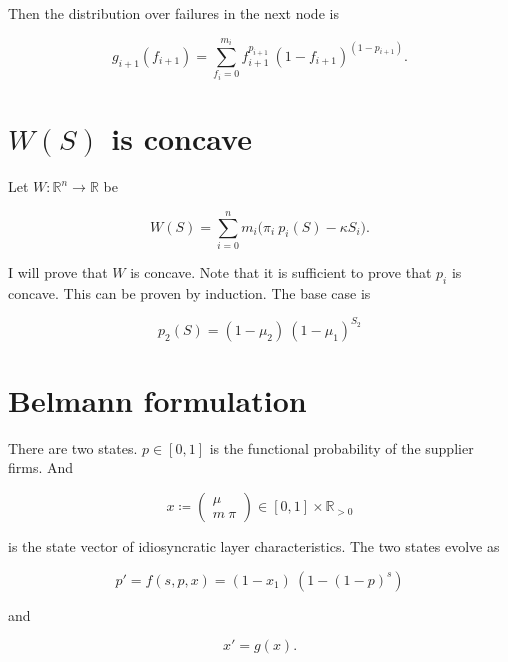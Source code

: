 \documentclass[american, abstract=on]{scrartcl}
\renewcommand{\Re}{\mathbb{R}}
\begin{document}
Then the distribution over failures in the next node is

\begin{equation}
  g_{i+1}(f_{i+1}) = \sum^{m_i}_{f_i = 0} f_{i+1}^{p_{i+1}} \ (1 - f_{i + 1})^{(1 - p_{i + 1})}.
\end{equation}

\newpage
\nocite{*}
\printbibliography

\newpage
\appendix
\section[Concavity of social planner problem]{$W(S)$ is concave}

Let $W: \Re^n \to \Re$ be

\begin{equation}
  W(S) = \sum^n_{i = 0} m_i \Big( \pi_i \ p_i(S) - \kappa S_i \Big).
\end{equation}

I will prove that $W$ is concave. Note that it is sufficient to prove that $p_i$ is concave. This can be proven by induction. The base case is 

\begin{equation}
  p_2(S) = (1 - \mu_2) \ (1 - \mu_1)^{S_2}
\end{equation}

\section{Belmann formulation}

There are two states. $p \in [0, 1]$ is the functional probability of the supplier firms. And 

\begin{equation}
  x \coloneqq \begin{pmatrix}
    \mu \\ m \ \pi
  \end{pmatrix} \in [0, 1] \times \Re_{>0}
\end{equation}

is the state vector of idiosyncratic layer characteristics. The two states evolve as

\begin{equation}
  p' = f(s, p, x) = (1 - x_1) \ (1 - (1 - p)^s)
\end{equation}

and

\begin{equation}
  x' = g(x).
\end{equation}
\end{document}
